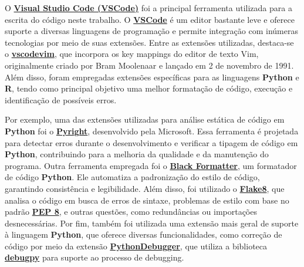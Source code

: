 \documentclass[
  12pt,
  a4paper,
]{scrreprt}
\begin{document}
\vspace{12pt}

O \href{https://code.visualstudio.com/}{\textbf{Visual Studio Code
(VSCode)}} foi a principal ferramenta utilizada para a escrita do código
neste trabalho. O \href{https://code.visualstudio.com/}{\textbf{VSCode}}
é um editor bastante leve e oferece suporte a diversas linguagens de
programação e permite integração com inúmeras tecnologias por meio de
suas extensões. Entre as extensões utilizadas, destaca-se o
\href{https://marketplace.visualstudio.com/items?itemName=vscodevim.vim}{\textbf{vscodevim}},
que incorpora os key mappings do editor de texto Vim, originalmente
criado por Bram Moolenaar e lançado em 2 de novembro de 1991. Além
disso, foram empregadas extensões específicas para as linguagens
\textbf{Python} e \textbf{R}, tendo como principal objetivo uma melhor
formatação de código, execução e identificação de possíveis erros.

\vspace{12pt}

Por exemplo, uma das extensões utilizadas para análise estática de
código em \textbf{Python} foi o
\href{https://marketplace.visualstudio.com/items?itemName=ms-pyright.pyright}{\textbf{Pyright}},
desenvolvido pela Microsoft. Essa ferramenta é projetada para detectar
erros durante o desenvolvimento e verificar a tipagem de código em
\textbf{Python}, contribuindo para a melhoria da qualidade e da
manutenção do programa. Outra ferramenta empregada foi o
\href{https://marketplace.visualstudio.com/items?itemName=ms-python.black-formatter}{\textbf{Black
Formatter}}, um formatador de código \textbf{Python}. Ele automatiza a
padronização do estilo de código, garantindo consistência e
legibilidade. Além disso, foi utilizado o
\href{https://marketplace.visualstudio.com/items?itemName=ms-python.flake8}{\textbf{Flake8}},
que analisa o código em busca de erros de sintaxe, problemas de estilo
com base no padrão \href{https://peps.python.org/pep-0008/}{\textbf{PEP
8}}, e outras questões, como redundâncias ou importações desnecessárias.
Por fim, também foi utilizada uma extensão mais geral de suporte à
linguagem \textbf{Python}, que oferece diversas funcionalidades, como
correção de código por meio da extensão
\href{https://marketplace.visualstudio.com/items?itemName=ms-python.debugpy}{\textbf{PythonDebugger}},
que utiliza a biblioteca
\href{https://pypi.org/project/debugpy/}{\textbf{debugpy}} para suporte
ao processo de debugging.

\vspace{12pt}
\end{document}
